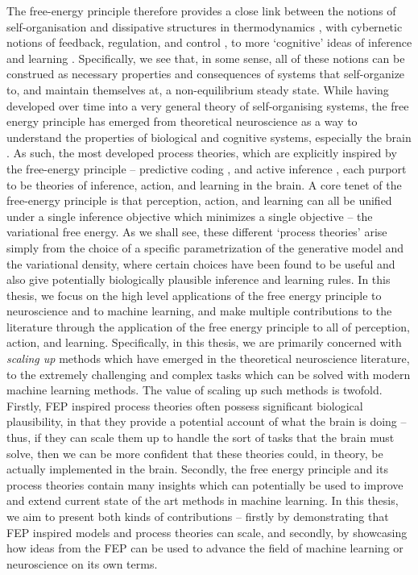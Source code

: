 The free-energy principle therefore provides a close link between the notions of self-organisation and dissipative structures in thermodynamics \citep{prigogine1973theory,seifert2008stochastic}, with cybernetic notions of feedback, regulation, and control \citep{wiener2019cybernetics,kalman1960contributions,johnson2005pid}, to more `cognitive' ideas of inference and learning \citep{schmidhuber1991possibility,dayan2008decision,rao1999predictive}. Specifically, we see that, in some sense, all of these notions can be construed as necessary properties and consequences of systems that self-organize to, and maintain themselves at, a non-equilibrium steady state. While having developed over time into a very general theory of self-organising systems, the free energy principle has emerged from theoretical neuroscience as a way to understand the properties of biological and cognitive systems, especially the brain \citep{friston2003learning,friston2006free}. As such, the most developed process theories, which are explicitly inspired by the free-energy principle -- predictive coding \citep{mumford1992computational,rao1999predictive,friston2005theory}, and active inference \citep{friston2012active,friston2015active,friston2017active}, each purport to be theories of inference, action, and learning in the brain. A core tenet of the free-energy principle is that perception, action, and learning can all be unified under a single inference objective which minimizes a single objective -- the variational free energy. As we shall see, these different `process theories' arise simply from the choice of a specific parametrization of the generative model and the variational density, where certain choices have been found to be useful and also give potentially biologically plausible inference and learning rules. In this thesis, we focus on the high level applications of the free energy principle to neuroscience and to machine learning, and make multiple contributions to the literature through the application of the free energy principle to all of perception, action, and learning. Specifically, in this thesis, we are primarily concerned with \emph{scaling up} methods which have emerged in the theoretical neuroscience literature, to the extremely challenging and complex tasks which can be solved with modern machine learning methods. The value of scaling up such methods is twofold. Firstly, FEP inspired process theories often possess significant biological plausibility, in that they provide a potential account of what the brain is doing -- thus, if they can scale them up to handle the sort of tasks that the brain must solve, then we can be more confident that these theories could, in theory, be actually implemented in the brain. Secondly, the free energy principle and its process theories contain many insights which can potentially be used to improve and extend current state of the art methods in machine learning. In this thesis, we aim to present both kinds of contributions -- firstly by demonstrating that FEP inspired models and process theories can scale, and secondly, by showcasing how ideas from the FEP can be used to advance the field of machine learning or neuroscience on its own terms. 


